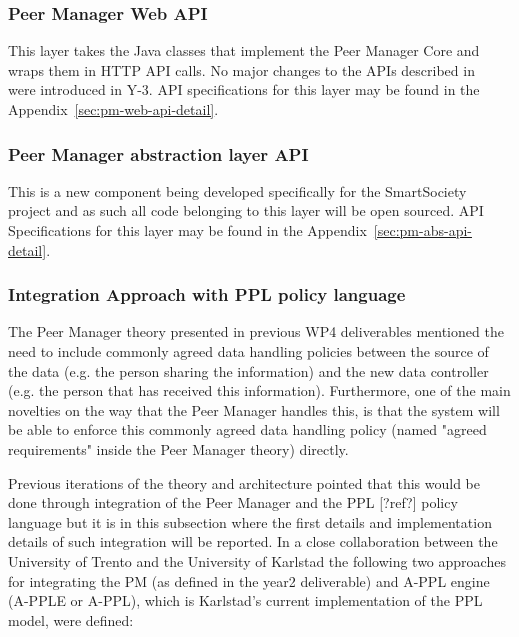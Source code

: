 \subsubsection{Peer Manager Web API} \label{ssec:pm-web-api}
This layer takes the Java classes that implement the Peer Manager Core and wraps them in HTTP API calls. 
No major changes to the APIs described in~\cite{D4.2} were introduced in Y-3. API specifications for this layer may be found in the Appendix~\ref{sec:pm-web-api-detail}.

\subsubsection{Peer Manager abstraction layer API} \label{ssec:pm-abs-api}
 
This is a new component being developed specifically for the SmartSociety project and as such all code belonging to this layer will be open sourced. API Specifications for this layer may be found in the Appendix~\ref{sec:pm-abs-api-detail}.

\subsubsection{Integration Approach with PPL policy language}

The Peer Manager theory presented in previous WP4 deliverables mentioned the need to include commonly agreed data handling policies between the source of the data (e.g. the person sharing the information) and the new data controller (e.g. the person that has received this information). Furthermore, one of the main novelties on the way that the Peer Manager handles this, is that the system will be able to enforce this commonly agreed data handling policy (named "agreed requirements" inside the Peer Manager theory) directly.

Previous iterations of the theory and architecture pointed that this would be done through integration of the Peer Manager and the PPL [?ref?] policy language but it is in this subsection where the first details and implementation details of such integration will be reported. 
In a close collaboration between the University of Trento and the University of Karlstad the following two approaches for integrating the PM (as defined in the year2 deliverable) and A-PPL engine (A-PPLE or A-PPL), which is Karlstad's current implementation of the PPL model, were defined:

